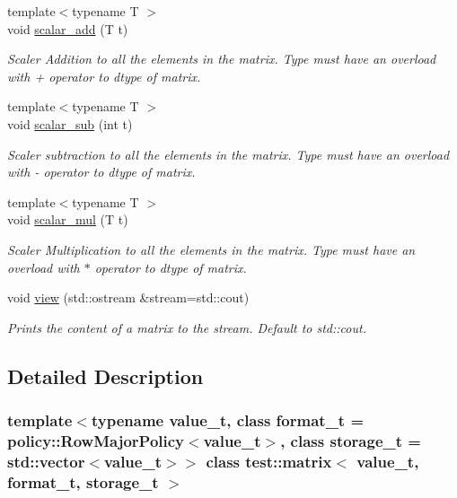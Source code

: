 \begin{DoxyCompactItemize}
{\footnotesize template$<$typename T $>$ }\\void \mbox{\hyperlink{classtest_1_1matrix_a0bb59ea5c15a548758863aa46b291219}{scalar\+\_\+add}} (T t)
\begin{DoxyCompactList}\small\item\em Scaler Addition to all the elements in the matrix. Type must have an overload with + operator to dtype of matrix. \end{DoxyCompactList}\item 
{\footnotesize template$<$typename T $>$ }\\void \mbox{\hyperlink{classtest_1_1matrix_a65df8dc2b0c24cdc45e6063e9a779784}{scalar\+\_\+sub}} (int t)
\begin{DoxyCompactList}\small\item\em Scaler subtraction to all the elements in the matrix. Type must have an overload with -\/ operator to dtype of matrix. \end{DoxyCompactList}\item 
{\footnotesize template$<$typename T $>$ }\\void \mbox{\hyperlink{classtest_1_1matrix_a5c36fb88feb075b3302575914d3de483}{scalar\+\_\+mul}} (T t)
\begin{DoxyCompactList}\small\item\em Scaler Multiplication to all the elements in the matrix. Type must have an overload with $\ast$ operator to dtype of matrix. \end{DoxyCompactList}\item 
void \mbox{\hyperlink{classtest_1_1matrix_a854639ce240ca81c977aa7a1cc4be932}{view}} (std\+::ostream \&stream=std\+::cout)
\begin{DoxyCompactList}\small\item\em Prints the content of a matrix to the stream. Default to std\+::cout. \end{DoxyCompactList}\end{DoxyCompactItemize}


\subsection{Detailed Description}
\subsubsection*{template$<$typename value\+\_\+t, class format\+\_\+t = policy\+::\+Row\+Major\+Policy$<$value\+\_\+t$>$, class storage\+\_\+t = std\+::vector$<$value\+\_\+t$>$$>$\newline
class test\+::matrix$<$ value\+\_\+t, format\+\_\+t, storage\+\_\+t $>$}

